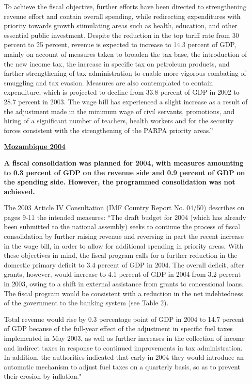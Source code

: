 To achieve the fiscal objective, further efforts have been directed to strengthening revenue effort and contain overall spending, while redirecting expenditures with priority towards growth stimulating areas such as health, education, and other essential public investment. Despite the reduction in the top tariff rate from 30 percent to 25 percent, revenue is expected to increase to 14.3 percent of GDP, mainly on account of measures taken to broaden the tax base, the introduction of the new income tax, the increase in specific tax on petroleum products, and farther strengthening of tax administration to enable more vigorous combating of smuggling and tax evasion. Measures are also contemplated to contain expenditure, which is projected to decline from 33.8 percent of GDP in 2002 to 28.7 percent in 2003. The wage bill has experienced a slight increase as a result of the adjustment made in the minimum wage of civil servants, promotions, and hiring of a significant number of teachers, health workers and for the security forces consistent with the strengthening of the PARPA priority areas.”

\textbf{\underline{Mozambique 2004}}

\textbf{A fiscal consolidation was planned for 2004, with measures amounting to 0.3 percent of GDP on the revenue side and 0.9 percent of GDP on the spending side. However, the programmed consolidation was not achieved.}

The 2003 Article IV Consultation (IMF Country Report No. 04/50) describes on pages 9-11 the intended measures: “The draft budget for 2004 (which has already been submitted to the national assembly) seeks to continue the process of fiscal consolidation by further raising revenue and reversing in part the recent increase in the wage bill, in order to allow for additional spending in priority areas. With these objectives in mind, the fiscal program calls for a further reduction in the domestic primary deficit to 3.4 percent of GDP in 2004. The overall deficit, after grants, however, would increase to 4.1 percent of GDP in 2004 from 3.2 percent in 2003, owing to a shift in external assistance from grants to concessional loans. 
The fiscal program would be consistent with a reduction in the net indebtedness of the government to the banking system (see Table 2).

Total revenue would rise by 0.3 percentage point of GDP in 2004 to 14.7 percent of GDP because of the full-year effect of the adjustment in specific fuel taxes implemented in May 2003, as well as further increases in the collection of income and indirect taxes in response to continued improvements in tax administration. In addition, the authorities indicated that early in 2004 they would introduce an automatic mechanism to adjust fuel taxes on a quarterly basis, so as to prevent their erosion by inflation."

